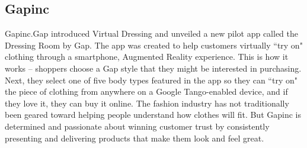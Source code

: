 \subsection{Gapinc}
Gapinc.Gap introduced Virtual Dressing and unveiled a new pilot app called the Dressing Room by Gap. The app was created to help customers virtually “try on" clothing through a smartphone, Augmented Reality experience. This is how it works – shoppers choose a Gap style that they might be interested in purchasing. Next, they select one of five body types featured in the app so they can “try on" the piece of clothing from anywhere on a Google Tango-enabled device, and if they love it, they can buy it online.
The fashion industry has not traditionally been geared toward helping people understand how clothes will fit. But Gapinc is determined and passionate about winning customer trust by consistently presenting and delivering products that make them look and feel great.\cite{Gapinic}

